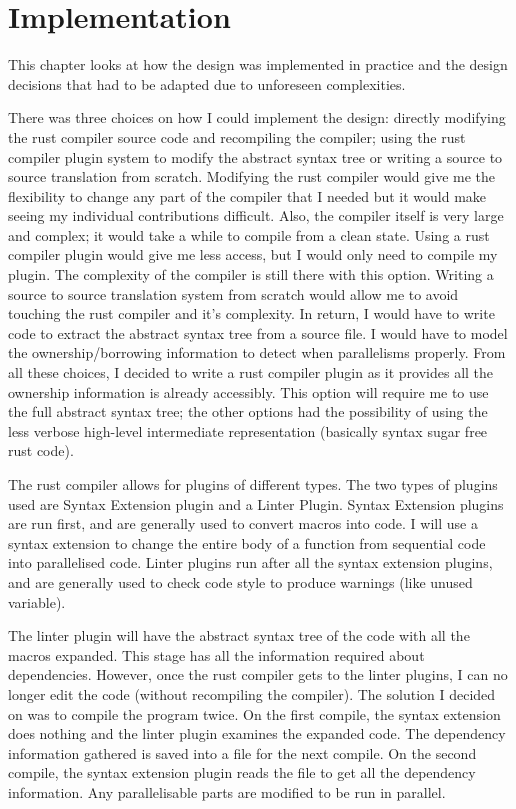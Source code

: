 \chapter{Implementation}
\label{chapter:Implementation}

This chapter looks at how the design was implemented in practice and the design decisions that had to be adapted due to unforeseen complexities. 

There was three choices on how I could implement the design: directly modifying the rust compiler source code and recompiling the compiler; using the rust compiler plugin system to modify the abstract syntax tree or writing a source to source translation from scratch. Modifying the rust compiler would give me the flexibility to change any part of the compiler that I needed but it would make seeing my individual contributions difficult. Also, the compiler itself is very large and complex; it would take a while to compile from a clean state. Using a rust compiler plugin would give me less access, but I would only need to compile my plugin. The complexity of the compiler is still there with this option. Writing a source to source translation system from scratch would allow me to avoid touching the rust compiler and it's complexity. In return, I would have to write code to extract the abstract syntax tree from a source file. I would have to model the ownership/borrowing information to detect when parallelisms properly. From all these choices, I decided to write a rust compiler plugin as it provides all the ownership information is already accessibly. This option will require me to use the full abstract syntax tree; the other options had the possibility of using the less verbose high-level intermediate representation (basically syntax sugar free rust code).


The rust compiler allows for plugins of different types. The two types of plugins used are Syntax Extension plugin and a Linter Plugin. Syntax Extension plugins are run first, and are generally used to convert macros into code. I will use a syntax extension to change the entire body of a function from sequential code into parallelised code. Linter plugins run after all the syntax extension plugins, and are generally used to check code style to produce warnings (like unused variable).

The linter plugin will have the abstract syntax tree of the code with all the macros expanded. This stage has all the information required about dependencies. However, once the rust compiler gets to the linter plugins, I can no longer edit the code (without recompiling the compiler). The solution I decided on was to compile the program twice. On the first compile, the syntax extension does nothing and the linter plugin examines the expanded code. The dependency information gathered is saved into a file for the next compile. On the second compile, the syntax extension plugin reads the file to get all the dependency information. Any parallelisable parts are modified to be run in parallel.

